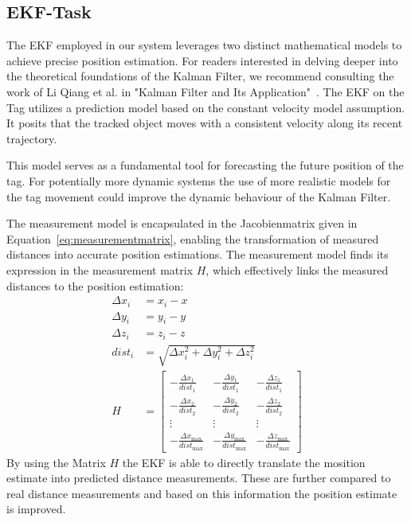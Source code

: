 \documentclass[conference, a4paper]{IEEEtran}
\begin{document}
\subsection{EKF-Task}\label{section:firmware-ekf}
The \ac{EKF} employed in our system leverages two distinct mathematical models
to achieve precise position estimation.
For readers interested in delving deeper into the theoretical foundations of the
Kalman Filter, we recommend consulting the work of Li Qiang et al. in
"Kalman Filter and Its Application"~\cite{Kalman}.
The EKF  on the Tag utilizes a prediction model based on the constant velocity model assumption.
It posits that the tracked object moves with a consistent velocity along its recent
trajectory.

This model serves as a fundamental tool for forecasting the future position of the tag.
For potentially more dynamic systems the use of more realistic models
for the tag movement could improve the dynamic behaviour of the Kalman Filter.

The measurement model is encapsulated in the Jacobienmatrix given in Equation~\ref{eq:measurementmatrix},
enabling the transformation of measured distances into accurate position estimations.
The measurement model finds its expression in the measurement matrix $H$,
which effectively links the measured distances to the position estimation:
\begin{equation}
	\begin{aligned}
		\Delta x_i &= x_i - x \\
		\Delta y_i &= y_i - y \\
		\Delta z_i &= z_i - z \\
		dist_i &= \sqrt{{\Delta x_i^2 + \Delta y_i^2 + \Delta z_i^2}} \\
		H &= \begin{bmatrix}
			-\frac{{\Delta x_1}}{{dist_1}} & -\frac{{\Delta y_1}}{{dist_1}} & -\frac{{\Delta z_1}}{{dist_1}} \\
			-\frac{{\Delta x_2}}{{dist_2}} & -\frac{{\Delta y_2}}{{dist_2}} & -\frac{{\Delta z_2}}{{dist_2}} \\
			\vdots & \vdots & \vdots \\
			-\frac{{\Delta x_{\text{max}}}}{{dist_{\text{max}}}} & -\frac{{\Delta y_{\text{max}}}}{{dist_{\text{max}}}} & -\frac{{\Delta z_{\text{max}}}}{{dist_{\text{max}}}}
		\end{bmatrix}
	\end{aligned}
	\label{eq:measurementmatrix}
\end{equation}
By using the Matrix $H$ the \ac{EKF} is able to directly translate the mosition estimate into predicted distance measurements.
These are further compared to real distance measurements and based on this information the position estimate is improved.
\end{document}
